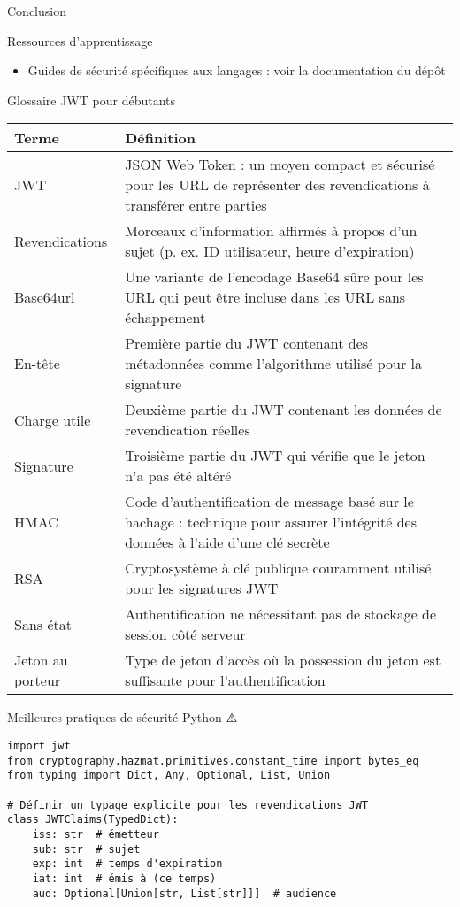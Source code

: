 \documentclass[presentation,aspectratio=169]{beamer}
\begin{document}
\begin{frame}[label={sec:orgc6c3753},fragile]{Conclusion}
\begin{block}{Ressources d'apprentissage}
\begin{itemize}[<+->]
\item Guides de sécurité spécifiques aux langages : voir la documentation du dépôt
\end{itemize}
\end{block}
\begin{block}{Glossaire JWT pour débutants 🔰}
\begin{center}
\begin{tabular}{ll}
Terme & Définition\\
\hline
JWT & JSON Web Token : un moyen compact et sécurisé pour les URL de représenter des revendications à transférer entre parties\\
Revendications & Morceaux d'information affirmés à propos d'un sujet (p. ex. ID utilisateur, heure d'expiration)\\
Base64url & Une variante de l'encodage Base64 sûre pour les URL qui peut être incluse dans les URL sans échappement\\
En-tête & Première partie du JWT contenant des métadonnées comme l'algorithme utilisé pour la signature\\
Charge utile & Deuxième partie du JWT contenant les données de revendication réelles\\
Signature & Troisième partie du JWT qui vérifie que le jeton n'a pas été altéré\\
HMAC & Code d'authentification de message basé sur le hachage : technique pour assurer l'intégrité des données à l'aide d'une clé secrète\\
RSA & Cryptosystème à clé publique couramment utilisé pour les signatures JWT\\
Sans état & Authentification ne nécessitant pas de stockage de session côté serveur\\
Jeton au porteur & Type de jeton d'accès où la possession du jeton est suffisante pour l'authentification\\
\end{tabular}
\end{center}
\end{block}
\begin{block}{Meilleures pratiques de sécurité Python ⚠️}
\begin{verbatim}
import jwt
from cryptography.hazmat.primitives.constant_time import bytes_eq
from typing import Dict, Any, Optional, List, Union

# Définir un typage explicite pour les revendications JWT
class JWTClaims(TypedDict):
    iss: str  # émetteur
    sub: str  # sujet
    exp: int  # temps d'expiration
    iat: int  # émis à (ce temps)
    aud: Optional[Union[str, List[str]]]  # audience


\end{verbatim}
\end{block}
\end{frame}
\end{document}

